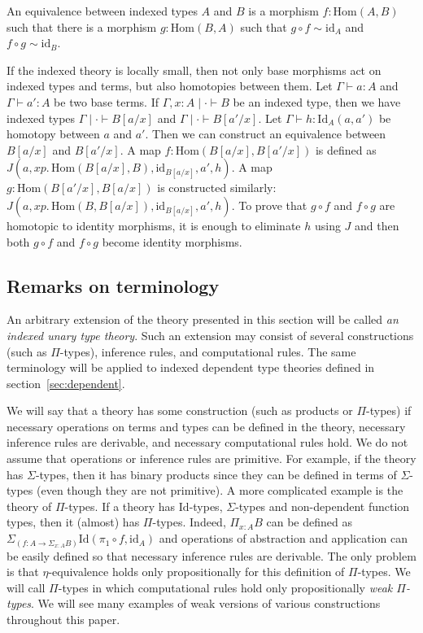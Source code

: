 \documentclass[reqno]{mscs}
\newcommand{\ob}{}
\newcommand{\fs}[1]{\mathrm{#1}}
\newcommand{\Hom}{\fs{Hom}}
\newcommand{\Id}{\fs{Id}}
\newcommand{\id}{\fs{id}}
\numberwithin{figure}{section}
\begin{document}
\begin{defn}[equiv]
An equivalence between indexed types $A$ and $B$ is a morphism $f : \Hom(A,B)$ such that there is a morphism $g : \Hom(B,A)$ such that $g \circ f \sim \id_A$ and $f \circ g \sim \id_B$.
\end{defn}

If the indexed theory is locally small, then not only base morphisms act on indexed types and terms, but also homotopies between them.
Let $\Gamma \vdash a : A$ and $\Gamma \vdash a' : A$ be two base terms.
If $\Gamma, x : A \mid \cdot \vdash B \ob$ be an indexed type, then we have indexed types $\Gamma \mid \cdot \vdash B[a/x] \ob$ and $\Gamma \mid \cdot \vdash B[a'/x] \ob$.
Let $\Gamma \vdash h : \Id_A(a,a')$ be homotopy between $a$ and $a'$.
Then we can construct an equivalence between $B[a/x]$ and $B[a'/x]$.
A map $f : \Hom(B[a/x],B[a'/x])$ is defined as $J(a, x p.\,\Hom(B[a/x],B), \id_{B[a/x]}, a', h)$.
A map $g : \Hom(B[a'/x],B[a/x])$ is constructed similarly: $J(a, x p.\,\Hom(B,B[a/x]), \id_{B[a/x]}, a', h)$.
To prove that $g \circ f$ and $f \circ g$ are homotopic to identity morphisms, it is enough to eliminate $h$ using $J$ and then both $g \circ f$ and $f \circ g$ become identity morphisms.

\subsection{Remarks on terminology}

An arbitrary extension of the theory presented in this section will be called \emph{an indexed unary type theory}.
Such an extension may consist of several constructions (such as $\Pi$-types), inference rules, and computational rules.
The same terminology will be applied to indexed dependent type theories defined in section~\ref{sec:dependent}.

We will say that a theory has some construction (such as products or $\Pi$-types) if necessary operations on terms and types can be defined in the theory, necessary inference rules are derivable, and necessary computational rules hold.
We do not assume that operations or inference rules are primitive.
For example, if the theory has $\Sigma$-types, then it has binary products since they can be defined in terms of $\Sigma$-types (even though they are not primitive).
A more complicated example is the theory of $\Pi$-types.
If a theory has $\Id$-types, $\Sigma$-types and non-dependent function types, then it (almost) has $\Pi$-types.
Indeed, $\Pi_{x : A} B$ can be defined as $\Sigma_{(f : A \to \Sigma_{x : A} B)} \Id(\pi_1 \circ f, \fs{id}_A)$ and operations of abstraction and application can be easily defined so that necessary inference rules are derivable.
The only problem is that $\eta$-equivalence holds only propositionally for this definition of $\Pi$-types.
We will call $\Pi$-types in which computational rules hold only propositionally \emph{weak $\Pi$-types}.
We will see many examples of weak versions of various constructions throughout this paper.
\end{document}
